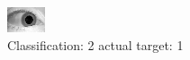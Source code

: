 \begin{figure}[h!]
\begin{center}
\includegraphics[width=0.60\columnwidth]{figures/ID1533_class_2_target_1.png}
\end{center}
\caption{ Classification: 2 actual target: 1}
\label{fig:ID1533_class_2_target_1}
\end{figure}
